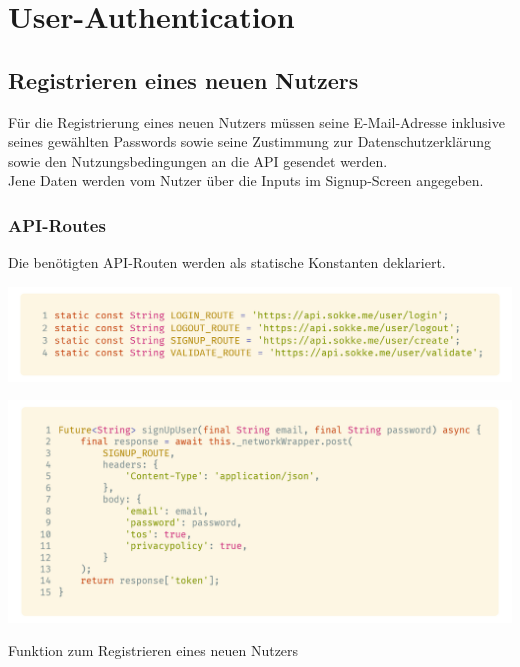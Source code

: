 \section{User-Authentication}
\label{clientuserauth}

\subsection{Registrieren eines neuen Nutzers}

Für die Registrierung eines neuen Nutzers müssen seine E-Mail-Adresse inklusive seines 
gewählten Passwords sowie seine Zustimmung zur Datenschutzerklärung sowie den Nutzungsbedingungen an die API gesendet werden.\\
Jene Daten werden vom Nutzer über die Inputs im Signup-Screen angegeben.

\subsubsection{API-Routes}

Die benötigten API-Routen werden als statische Konstanten deklariert.
\begin{code}
    \centering
    \includegraphics[width=1\textwidth]{images/Client/services/user-auth/userRoutes.png}
    \vspace{-25pt}
    \caption{Benötigte \lstinline{/user}-Routes der Sokka-API}
\end{code}

\begin{code}
    \centering
    \includegraphics[width=1\textwidth]{images/Client/services/user-auth/signup.png}
    \vspace{-25pt}
    \caption{Funktion zum Registrieren eines neuen Nutzers}
\end{code}

